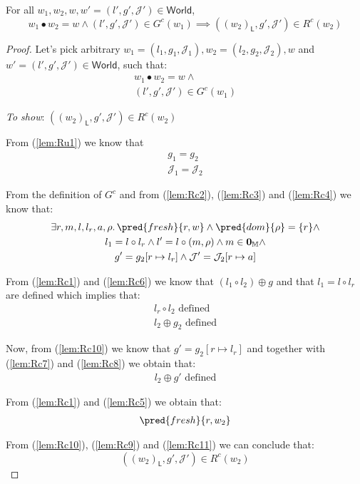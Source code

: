 \lem \label{lem:Rc}  For all $w_1, w_2, w, w' = (l', g', \mathcal{J}') \in \mathsf{World}$,
\[
	w_1 \bullet w_2 = w \land (l', g', \mathcal{J}') \in G^c(w_1) \implies ((w_2)_\mathsf{L}, g', \mathcal{J}') \in R^c(w_2)
\]

{\parindent0pt
\begin{proof}
Let's pick arbitrary $w_1 = (l_1, g_1, \mathcal{J}_1), w_2 = (l_2, g_2, \mathcal{J}_2), w$ and $w' = (l', g', \mathcal{J}') \in \mathsf{World}$, such that:
\begin{gather}
	\label{lem:Rc1} w_1 \bullet w_2 = w \land \\
	\label{lem:Rc2} (l', g', \mathcal{J}') \in G^c(w_1)
\end{gather}

\textit{To show}: $((w_2)_\mathsf{L}, g', \mathcal{J}') \in R^c(w_2)$

From (\ref{lem:Ru1}) we know that
\begin{gather}
	\label{lem:Rc3} g_1 = g_2 \\
	\label{lem:Rc4} \mathcal{J}_1 = \mathcal{J}_2
\end{gather}

From the definition of $G^c$ and from (\ref{lem:Rc2}), (\ref{lem:Rc3}) and (\ref{lem:Rc4}) we know that:
\begin{gather}
	\label{lem:Rc5} \exists r, m, l, l_r, a, \rho \ldotp \pred{fresh}{r, w} \land \pred{dom}{\rho} = \{r\} \land
	\\
	\label{lem:Rc6} l_1 = l \circ l_r \land l' = l \circ (m, \rho) \land m \in \mathbf{0}_\mathbb{M} \land
	\\
	\label{lem:Rc10} g' = g_2[r \mapsto l_r] \land \mathcal{J}' = \mathcal{J}_2[r \mapsto a]
\end{gather}

From (\ref{lem:Rc1}) and (\ref{lem:Rc6}) we know that $(l_1 \circ l_2) \oplus g$ and that $l_1 = l \circ l_r$ are defined which implies that:
\begin{gather}
	\label{lem:Rc7} l_r \circ l_2 \text{ defined}
	\\
	\label{lem:Rc8} l_2 \oplus g_2 \text{ defined}
\end{gather}

Now, from (\ref{lem:Rc10}) we know that $g' = g_2[r \mapsto l_r]$ and together with (\ref{lem:Rc7}) and (\ref{lem:Rc8}) we obtain that:
\begin{gather}
	\label{lem:Rc9} l_2 \oplus g' \text{ defined}
\end{gather}

From (\ref{lem:Rc1}) and (\ref{lem:Rc5}) we obtain that:
\begin{gather}
	\label{lem:Rc11} \pred{fresh}{r, w_2}
\end{gather}

From (\ref{lem:Rc10}), (\ref{lem:Rc9}) and (\ref{lem:Rc11}) we can conclude that:
\[
	((w_2)_\mathsf{L}, g', \mathcal{J}') \in R^c(w_2)
\]
\end{proof}
}

